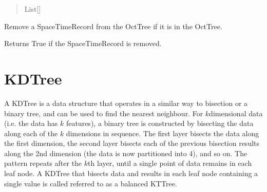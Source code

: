 \documentclass[letterpaper,10pt,english]{sphinxmanual}
\begin{document}
\begin{fulllineitems}
\begin{fulllineitems}
\begin{quote}
\begin{description}
\sphinxAtStartPar
List{[}{\hyperref[\detokenize{record:GeoSpatialTools.record.SpaceTimeRecord}]{}}{]}

\end{description}\end{quote}

\end{fulllineitems}


\begin{fulllineitems}
\label{\detokenize{octtree:GeoSpatialTools.octtree.OctTree.remove}}
\pysigstartsignatures
\pysiglinewithargsret
{}
{}
{}
\pysigstopsignatures
\sphinxAtStartPar
Remove a SpaceTimeRecord from the OctTree if it is in the OctTree.

\sphinxAtStartPar
Returns True if the SpaceTimeRecord is removed.
\begin{quote}\begin{description}
\sphinxAtStartPar
{}

\end{description}\end{quote}

\end{fulllineitems}


\end{fulllineitems}


\sphinxstepscope


\chapter{K\sphinxhyphen{}D\sphinxhyphen{}Tree}
\label{\detokenize{kdtree:k-d-tree}}\label{\detokenize{kdtree::doc}}
\sphinxAtStartPar
A K\sphinxhyphen{}D\sphinxhyphen{}Tree is a data structure that operates in a similar way to bisection or a binary tree, and can be used to find the
nearest neighbour. For \(k\)\sphinxhyphen{}dimensional data (i.e. the data has \(k\) features), a binary tree is constructed
by bisecting the data along each of the \(k\) dimensions in sequence. The first layer bisects the data along the
first dimension, the second layer bisects each of the previous bisection results along the 2nd dimension (the data is
now partitioned into 4), and so on. The pattern repeats after the \(k\)\sphinxhyphen{}th layer, until a single point of data
remains in each leaf node. A K\sphinxhyphen{}D\sphinxhyphen{}Tree that bisects data and results in each leaf node containing a single value is
called referred to as a balanced K\sphinxhyphen{}T\sphinxhyphen{}Tree.
\end{document}
